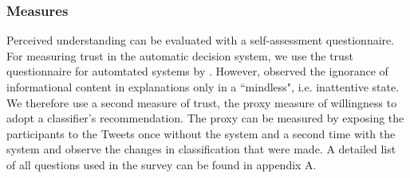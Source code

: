 \subsubsection{Measures}
Perceived understanding can be evaluated with a self-assessment questionnaire.\newline
For measuring trust in the automatic decision system, we use the trust questionnaire for automtated systems by \cite{ruping2006learning}. However, \cite{langer1978mindlessness} observed the ignorance of informational content in explanations only in a ``mindless", i.e. inattentive state. We therefore use a second measure of trust, the proxy measure of willingness to adopt a classifier's recommendation. The proxy can be measured by exposing the participants to the Tweets once without the system and a second time with the system and observe the changes in classification that were made. A detailed list of all questions used in the survey can be found in appendix A.

